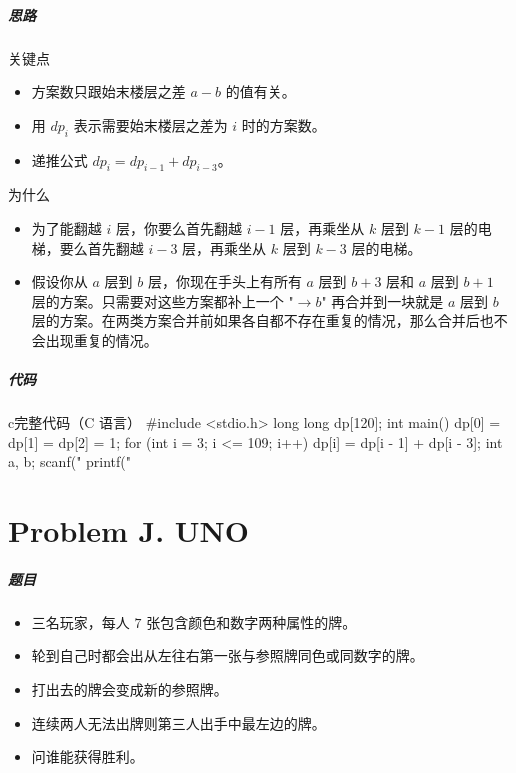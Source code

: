 \documentclass[
     aspectratio=169,                   %
]{beamer}
\begin{document}
\begin{frame}
	\frametitle{思路}
	 \begin{exampleblock}{关键点}
		 \begin{itemize}
			\item 方案数只跟始末楼层之差 $a-b$ 的值有关。
		\end{itemize}
	\end{exampleblock}
	\begin{itemize}
		\item 用 $dp_i$ 表示需要始末楼层之差为 $i$ 时的方案数。
		\item 递推公式 $dp_i=dp_{i-1}+dp_{i-3}$。
	\end{itemize}
	
	\begin{block}{为什么}
		\begin{itemize}
			\item 为了能翻越 $i$ 层，你要么首先翻越 $i-1$ 层，再乘坐从 $k$ 层到 $k-1$ 层的电梯，要么首先翻越 $i-3$ 层，再乘坐从 $k$ 层到 $k-3$ 层的电梯。
			\item 假设你从 $a$ 层到 $b$ 层，你现在手头上有所有 $a$ 层到 $b+3$ 层和 $a$ 层到 $b+1$ 层的方案。只需要对这些方案都补上一个 "$\to b$" 再合并到一块就是 $a$ 层到 $b$ 层的方案。在两类方案合并前如果各自都不存在重复的情况，那么合并后也不会出现重复的情况。
		\end{itemize}
	\end{block}
\end{frame}

\begin{frame}[fragile]
	\frametitle{代码}
	 \begin{codeblock}{c}{完整代码（C 语言）}
#include <stdio.h>
long long dp[120];
int main() {
    dp[0] = dp[1] = dp[2] = 1;
    for (int i = 3; i <= 109; i++) {
        dp[i] = dp[i - 1] + dp[i - 3];
    }
    int a, b;
    scanf("%
    printf("%
}
\end{codeblock}
\end{frame}


\part{Problem J. UNO}
\begin{frame}
	\frametitle{题目}
	\begin{itemize}
		\item 三名玩家，每人 $7$ 张包含颜色和数字两种属性的牌。
		\item 轮到自己时都会出从左往右第一张与参照牌同色或同数字的牌。
		\item 打出去的牌会变成新的参照牌。
		\item 连续两人无法出牌则第三人出手中最左边的牌。
		\item 问谁能获得胜利。
	\end{itemize}
\end{frame}
\end{document}
